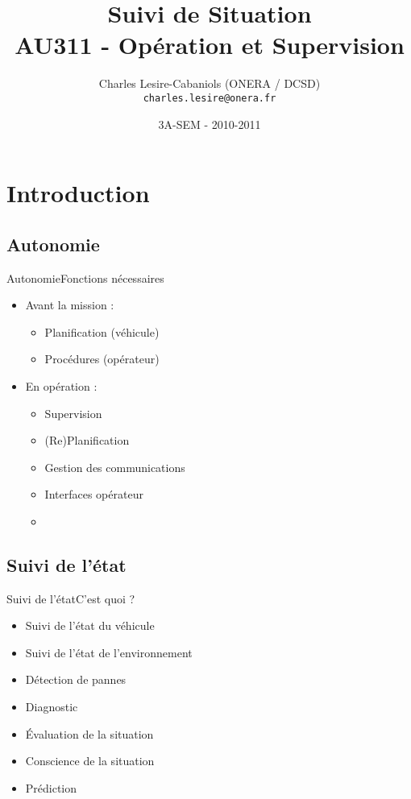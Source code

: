 \documentclass[compress]{beamer}
\title[SEM AU311 - Suivi de Situation]{{\Large Suivi de Situation}\\AU311 - Opération et Supervision}
\author[Charles Lesire]{Charles Lesire-Cabaniols (ONERA / DCSD)\\{\tt charles.lesire@onera.fr}}
\date[2010-2011]{3A-SEM - 2010-2011}
\begin{document}
\begin{frame}
\titlepage
\end{frame}

\begin{frame}
\tableofcontents[hidesubsections]
\end{frame}

\section{Introduction}

\subsection{Autonomie}
\begin{frame}{Autonomie}{Fonctions nécessaires}
\begin{itemize}
\item Avant la mission : 
	\begin{itemize}
	\item Planification (véhicule)
	\item Procédures (opérateur)
	\end{itemize}
\item En opération :
	\begin{itemize}
	\item Supervision
	\item (Re)Planification
	\item Gestion des communications
	\item Interfaces opérateur
	\item {}
	\end{itemize}
\end{itemize}
\end{frame}


\subsection{Suivi de l'état}
\begin{frame}{Suivi de l'état}{C'est quoi ?}
\begin{itemize}
\item Suivi de l'état du véhicule
\item Suivi de l'état de l'environnement
\item Détection de pannes
\item Diagnostic
\item \'Evaluation de la situation
\item Conscience de la situation
\item Prédiction
\end{itemize}
\end{frame}
\end{document}
